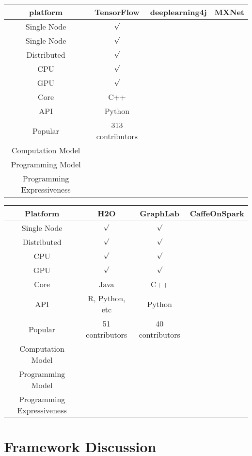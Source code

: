 \documentclass{article}
\begin{document}
\begin{tabular}{|c|c|c|c|}
\hline
platform & TensorFlow & deeplearning4j & MXNet \\
\hline
Single Node & ${\surd}$  &  &  \\
\hline
Single Node & ${\surd}$  &  &  \\
\hline
Distributed & ${\surd}$ &  &   \\
\hline
CPU & ${\surd}$ &  &  \\
\hline
GPU & ${\surd}$ &  &  \\
\hline
Core & C++ &  &  \\
\hline
API & Python &  &  \\
\hline
Popular & 313 contributors &  &  \\
\hline
Computation Model & &  \\
\hline
Programming Model & & \\
\hline
Programming Expressiveness & & \\
\hline
\end{tabular}

\begin{tabular}{|c|c|c|c|}
\hline
Platform & H2O & GraphLab & CaffeOnSpark \\
\hline
Single Node & ${\surd}$ & ${\surd}$ &  \\
\hline
Distributed & ${\surd}$ & ${\surd}$ &  \\
\hline
CPU & ${\surd}$ & ${\surd}$ &  \\
\hline
GPU & ${\surd}$ & ${\surd}$ &  \\
\hline
Core & Java & C++ &  \\
\hline
API & R, Python, etc & Python &  \\
\hline
Popular & 51 contributors & 40 contributors &  \\
\hline
Computation Model & &  \\
\hline
Programming Model & & \\
\hline
Programming Expressiveness & & \\
\hline
\end{tabular}

\section{Framework Discussion}
\end{document}
